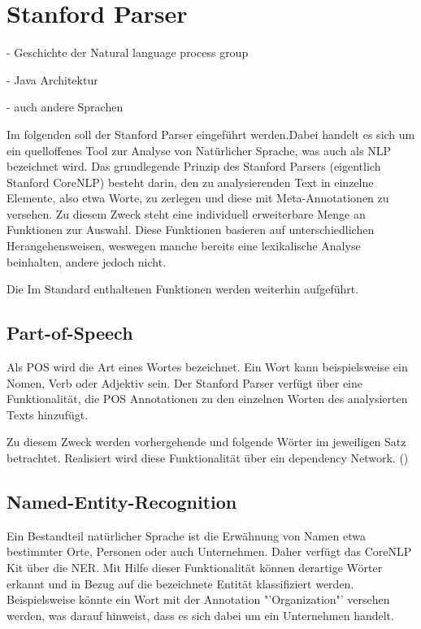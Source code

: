 \section{Stanford Parser}
- Geschichte der Natural language process group\par
- Java Architektur \par 
- auch andere Sprachen \par

Im folgenden soll der Stanford Parser eingeführt werden.Dabei handelt es sich um ein quelloffenes Tool zur Analyse von Natürlicher Sprache, was auch als \ac{NLP} bezeichnet wird. Das grundlegende Prinzip des Stanford Parsers (eigentlich Stanford CoreNLP) besteht darin, den zu analysierenden Text in einzelne Elemente, also etwa Worte, zu zerlegen und diese mit Meta-Annotationen zu versehen. Zu diesem Zweck steht eine individuell erweiterbare Menge an Funktionen zur Auswahl. Diese Funktionen basieren auf unterschiedlichen Herangehensweisen, weswegen manche bereits eine lexikalische Analyse beinhalten, andere jedoch nicht.\par 
Die Im Standard enthaltenen Funktionen werden weiterhin aufgeführt.

\subsection{Part-of-Speech}
Als \ac{POS} wird die Art eines Wortes bezeichnet. Ein Wort kann beispielsweise ein Nomen, Verb oder Adjektiv sein. Der Stanford Parser verfügt über eine Funktionalität, die \ac{POS} Annotationen zu den einzelnen Worten des analysierten Texts hinzufügt.\par
Zu diesem Zweck werden vorhergehende und folgende Wörter im jeweiligen Satz betrachtet. Realisiert wird diese Funktionalität über ein dependency Network. (\cite[vgl.][1]{POSTAGGER})

\subsection{Named-Entity-Recognition}
Ein Bestandteil natürlicher Sprache ist die Erwähnung von Namen etwa bestimmter Orte, Personen oder auch Unternehmen. Daher verfügt das CoreNLP Kit über die \ac{NER}. Mit Hilfe dieser Funktionalität können derartige Wörter erkannt und in Bezug auf die bezeichnete Entität klassifiziert werden. Beispielsweise könnte ein Wort mit der Annotation "'Organization"' versehen werden, was darauf hinweist, dass es sich dabei um ein Unternehmen handelt.

